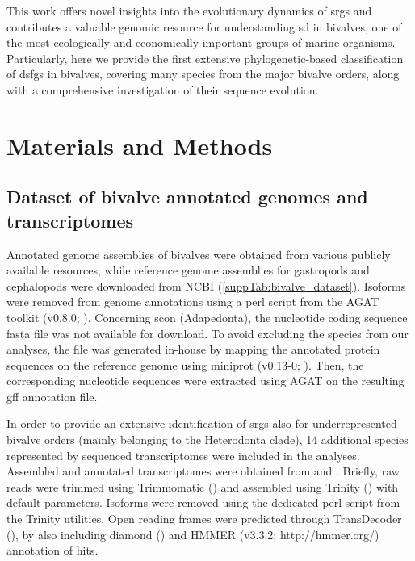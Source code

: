 This work offers novel insights into the evolutionary dynamics of \glspl{srg} and contributes a valuable genomic resource for understanding \gls{sd} in bivalves, one of the most ecologically and economically important groups of marine organisms. Particularly, here we provide the first extensive phylogenetic-based classification of \glspl{dsfg} in bivalves, covering many species from the major bivalve orders, along with a comprehensive investigation of their sequence evolution.

\section{Materials and Methods} \label{chapter3_MM}
\subsection{Dataset of bivalve annotated genomes and transcriptomes}
Annotated genome assemblies of bivalves were obtained from various publicly available resources, while reference genome assemblies for gastropods and cephalopods were downloaded from NCBI (\cref{suppTab:bivalve_dataset}). Isoforms were removed from genome annotations using a perl script from the AGAT toolkit (v0.8.0; \textbf{\cite{dainat2022another}}). Concerning \gls{scon} (Adapedonta), the nucleotide coding sequence fasta file was not available for download. To avoid excluding the species from our analyses, the file was generated in-house by mapping the annotated protein sequences on the reference genome using miniprot (v0.13-0; \textbf{\cite{li2023miniprot}}). Then, the corresponding nucleotide sequences were extracted using AGAT on the resulting gff annotation file.

In order to provide an extensive identification of \glspl{srg} also for underrepresented bivalve orders (mainly belonging to the Heterodonta clade), 14 additional species represented by sequenced transcriptomes were included in the analyses. Assembled and annotated transcriptomes were obtained from \textbf{\cite{piccinini2021mitonuclear}} and \textbf{\cite{iannello2023signatures}}. Briefly, raw reads were trimmed using Trimmomatic (\textbf{\cite{bolger2014trimmomatic}}) and assembled using Trinity (\textbf{\cite{grabherr2011trinity}}) with default parameters. Isoforms were removed using the dedicated perl script from the Trinity utilities. Open reading frames were predicted through TransDecoder (\textbf{\cite{haasTransdecoder}}), by also including diamond (\textbf{\cite{buchfink2015fast}}) and HMMER (v3.3.2; http://hmmer.org/) annotation of hits.

